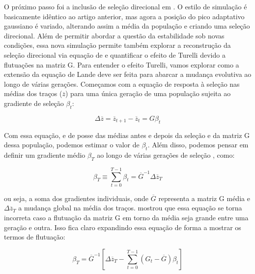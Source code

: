 O próximo passo foi a inclusão de seleção direcional em
\cite{Jones2004}. 
O estilo de simulação é basicamente idêntico ao artigo anterior, mas
agora a posição do pico adaptativo gaussiano é variado, alterando assim
a média da população e criando uma seleção direcional. 
Além de permitir abordar a questão da estabilidade sob novas condições,
essa nova simulação permite também explorar a reconstrução da seleção
direcional via equação de \cite{Lande1979} e quantificar o efeito de
Turelli devido a flutuações na matriz G. 
Para entender o efeito Turelli, vamos explorar como a extensão da
equação de Lande deve ser feita para abarcar a mudança evolutiva ao
longo de várias gerações. 
Começamos com a equação de resposta à seleção nas médias dos traços
($\overline {z}$) para uma única geração de uma população sujeita ao
gradiente de seleção $\beta_t$:

\begin{equation}
\Delta \overline {z} = \overline {z}_{t+1}-\overline {z}_{t}=G\beta_t
\end{equation}

Com essa equação, e de posse das médias antes e depois da seleção e da
matriz G dessa população, podemos estimar o valor de $\beta_t$. 
Além disso, podemos pensar em definir um gradiente médio $\beta_T$  ao
longo de várias gerações de seleção \citep{Lande1979}, como:

\begin{equation}
\beta_{T}\equiv \sum _{t=0}^{T-1} \beta_t =  \overline {G}^{-1}\Delta \overline {z}_T 
\end{equation}

ou seja, a soma dos gradientes individuais, onde $\overline {G}$
representa a matriz G média e $\Delta \overline {z}_T$ a mudança global
na média dos traços. 
\cite{Turelli1988} mostrou que essa equação se torna incorreta caso a
flutuação da matriz G em torno da média seja grande entre uma geração e
outra. 
Isso fica claro expandindo essa equação de forma a mostrar os termos de
flutuação:

\begin{equation}
   \beta_T = \overline {G}^{-1} \left[ \Delta \overline {z}_T - \sum_{t=0}^{T-1} (G_t - \overline {G}) \beta_t\right]
\end{equation}


